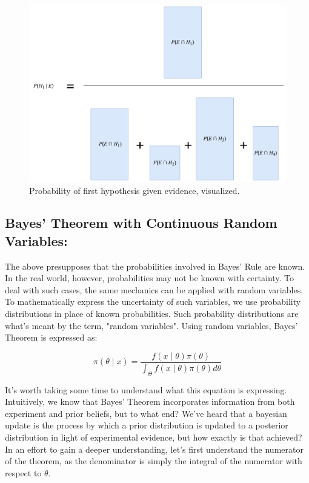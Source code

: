 \documentclass[12pt]{article}
\begin{document}
\begin{figure}[h!]
\centering
\includegraphics[width=1.0\textwidth]{assets/visual_7.png} 
\caption{Probability of first hypothesis given evidence, visualized.}
\label{fig:cond_prob}
\end{figure}

\newpage

\subsection*{Bayes' Theorem with Continuous Random Variables:}
\noindent The above presupposes that the probabilities involved in Bayes' Rule are known. In the real world, however, probabilities may not be known with certainty. To deal with such cases, the same mechanics can be applied with random variables. To mathematically express the uncertainty of such variables, we use probability distributions in place of known probabilities. Such probability distributions are what's meant by the term, "random variables". Using random variables, Bayes' Theorem is expressed as:

\begin{equation}
\pi(\theta \mid x) = \frac{f(x \mid \theta) \pi(\theta)}{\int_{\Theta} f(x \mid \theta) \pi(\theta) d\theta}
\end{equation}

\noindent It's worth taking some time to understand what this equation is expressing. Intuitively, we know that Bayes' Theorem incorporates information from both experiment and prior beliefs, but to what end? We've heard that a bayesian update is the process by which a prior distribution is updated to a posterior distribution in light of experimental evidence, but how exactly is that achieved? In an effort to gain a deeper understanding, let's first understand the numerator of the theorem, as the denominator is simply the integral of the numerator with respect to $\theta$. \\
\end{document}
